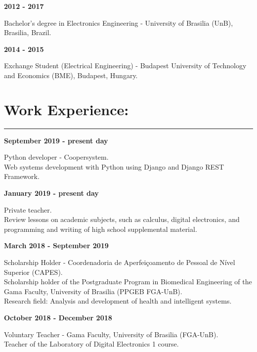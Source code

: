 \documentclass[11pt]{article}
\begin{document}
\textbf{2012 - 2017}
\begin{addmargin}{0.5cm}
Bachelor's degree in Electronics Engineering - University of Brasilia (UnB), Brasilia, Brazil. \\
\end{addmargin}

\textbf{2014 - 2015}
\begin{addmargin}{0.5cm}
Exchange Student (Electrical Engineering) - Budapest University of Technology and Economics (BME), Budapest, Hungary.
\end{addmargin}

\section{Work Experience:}
\hrule \vspace{0.1cm}

\textbf{September 2019 - present day}
\begin{addmargin}{0.5cm}
Python developer - Coopersystem.\\
Web systems development with Python using Django and Django REST Framework.\\
\end{addmargin}

\textbf{January 2019 - present day}
\begin{addmargin}{0.5cm}
Private teacher.\\
Review lessons on academic subjects, such as calculus, digital electronics, and 
programming and writing of high school supplemental material.\\
\end{addmargin}


\textbf{March 2018 - September 2019}
\begin{addmargin}{0.5cm}
Scholarship Holder - Coordenadoria de Aperfeiçoamento de Pessoal de Nível Superior (CAPES). \\
Scholarship holder of the Postgraduate Program in Biomedical Engineering of the
Gama Faculty, University of Brasilia (PPGEB FGA-UnB).\\
Research field: Analysis and development of health and intelligent systems.\\
\end{addmargin}

\textbf{October 2018 - December 2018}
\begin{addmargin}{0.5cm}
Voluntary Teacher -  Gama Faculty, University of Brasilia (FGA-UnB).\\
Teacher of the Laboratory of Digital Electronics 1 course. \\
\end{addmargin}
\end{document}
